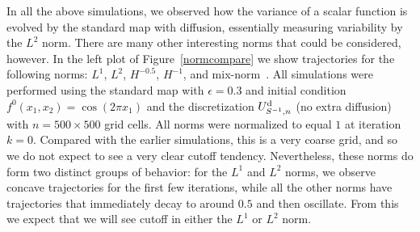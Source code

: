 \documentclass{aims}
\theoremstyle{definition}
\begin{document}
In all the above simulations, we observed how the variance of a scalar
function is evolved by the standard map with diffusion, essentially
measuring variability by the $L^2$ norm. There are many other
interesting norms that could be considered, however. In the left plot
of Figure~\ref{normcompare} we show trajectories for the following
norms: $L^1$, $L^2$, $H^{-0.5}$, $H^{-1}$, and
mix-norm~\cite{Mezic2005}. All simulations were performed using the
standard map with $\epsilon=0.3$ and initial condition $f^0(x_1,x_2)=
\cos(2\pi x_1)$ and the discretization $U_{S^{-1},n}^{\rm d}$ (no
extra diffusion) with $n=500 \times 500$ grid cells. All norms were
normalized to equal $1$ at iteration $k = 0$. Compared with the
earlier simulations, this is a very coarse grid, and so we do not
expect to see a very clear cutoff tendency. Nevertheless, these norms
do form two distinct groups of behavior: for the $L^1$ and $L^2$
norms, we observe concave trajectories for the first few iterations,
while all the other norms have trajectories that immediately decay to
around $0.5$ and then oscillate. From this we expect that we will see
cutoff in either the $L^1$ or $L^2$ norm.
\end{document}
